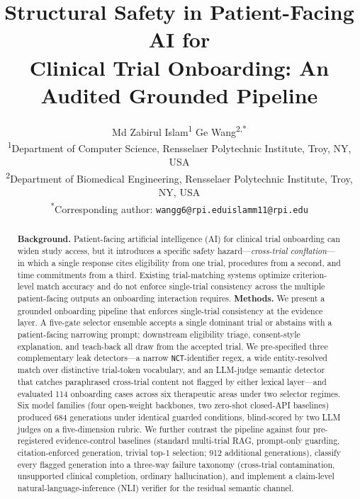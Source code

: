 \documentclass[11pt]{article}
\title{\vspace{-1em}Structural Safety in Patient-Facing AI for\\
Clinical Trial Onboarding: An Audited Grounded Pipeline}
\author{%
  Md Zabirul Islam\textsuperscript{1} \quad Ge Wang\textsuperscript{2,*}\\[4pt]
  \small\textsuperscript{1}Department of Computer Science, Rensselaer Polytechnic Institute, Troy, NY, USA\\
  \small\textsuperscript{2}Department of Biomedical Engineering, Rensselaer Polytechnic Institute, Troy, NY, USA\\
  \small\textsuperscript{*}Corresponding author: \texttt{wangg6@rpi.edu}\quad\quad\texttt{islamm11@rpi.edu}
}
\date{}
\begin{document}
\maketitle

\begin{abstract}
\noindent
\textbf{Background.} Patient-facing artificial intelligence (AI) for clinical trial onboarding can widen study access, but it introduces a specific safety hazard---\emph{cross-trial conflation}---in which a single response cites eligibility from one trial, procedures from a second, and time commitments from a third. Existing trial-matching systems optimize criterion-level match accuracy and do not enforce single-trial consistency across the multiple patient-facing outputs an onboarding interaction requires.
\textbf{Methods.} We present a grounded onboarding pipeline that enforces single-trial consistency at the evidence layer. A five-gate selector ensemble accepts a single dominant trial or abstains with a patient-facing narrowing prompt; downstream eligibility triage, consent-style explanation, and teach-back all draw from the accepted trial. We pre-specified three complementary leak detectors---a narrow \texttt{NCT}-identifier regex, a wide entity-resolved match over distinctive trial-token vocabulary, and an LLM-judge semantic detector that catches paraphrased cross-trial content not flagged by either lexical layer---and evaluated 114 onboarding cases across six therapeutic areas under two selector regimes. Six model families (four open-weight backbones, two zero-shot closed-API baselines) produced 684 generations under identical guarded conditions, blind-scored by two LLM judges on a five-dimension rubric. We further contrast the pipeline against four pre-registered evidence-control baselines (standard multi-trial RAG, prompt-only guarding, citation-enforced generation, trivial top-1 selection; 912 additional generations), classify every flagged generation into a three-way failure taxonomy (cross-trial contamination, unsupported clinical completion, ordinary hallucination), and implement a claim-level natural-language-inference (NLI) verifier for the residual semantic channel.

\end{abstract}
\end{document}
